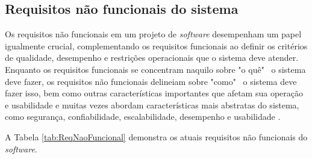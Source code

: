 \subsection{Requisitos não funcionais do sistema}

Os requisitos não funcionais em um projeto de \textit{software} desempenham um papel igualmente crucial, complementando os requisitos funcionais ao definir os critérios de qualidade, desempenho e restrições operacionais que o sistema deve atender. Enquanto os requisitos funcionais se concentram naquilo sobre "o quê" \ o sistema deve fazer, os requisitos não funcionais delineiam sobre "como" \ o sistema deve fazer isso, bem como outras características importantes que afetam sua operação e usabilidade e muitas vezes abordam características mais abstratas do sistema, como segurança, confiabilidade, escalabilidade, desempenho e usabilidade \cite{softwareengreq}. 
            
A Tabela \ref{tab:ReqNaoFuncional} demonstra os atuais requisitos não funcionais do \textit{software}.

